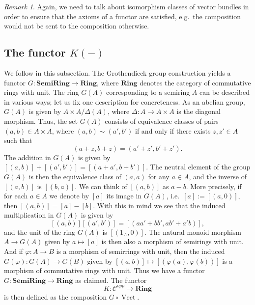 \documentclass[12pt,a4paper]{amsart}
\theoremstyle{plain}
\theoremstyle{definition}
\theoremstyle{remark}
\newtheorem{rem}[thm]{Remark}
\begin{document}
\begin{rem}
  Again, we need to talk about isomorphism classes of vector bundles in order to ensure that the axioms of a functor are satisfied, e.g.~the composition would not be sent to the composition otherwise.
\end{rem} 

\subsection{The functor $K(-)$}
We follow \cite[p.~44]{ati67} in this subsection.
The Grothendieck group construction yields a functor $G \colon \mathbf{SemiRing} \to \mathbf{Ring}$, where $\mathbf{Ring}$ denotes the category of commutative rings with unit.
The ring $G(A)$ corresponding to a semiring $A$ can be described in various ways; let us fix one description for concreteness.
As an abelian group, $G(A)$ is given by $A \times A/\Delta(A)$, where $\Delta \colon A \to A \times A$ is the diagonal morphism.
Thus, the set $G(A)$ consists of equivalence classes of pairs $(a,b) \in A \times A$, where $(a,b) \sim (a',b')$ if and only if there exists $z, z' \in A$ such that
\[ (a + z, b + z) = (a' + z', b' + z'). \]
The addition in $G(A)$ is given by $[(a,b)] + [(a',b')] = [(a + a', b + b')]$.
The neutral element of the group $G(A)$ is then the equivalence class of $(a,a)$ for any $a \in A$, and the inverse of $[(a,b)]$ is $[(b,a)]$.
We can think of $[(a,b)]$ as $a - b$.
More precisely, if for each $a \in A$ we denote by $[a]$ its image in $G(A)$, i.e.~$[a] := [(a,0)]$, then $[(a,b)] = [a] - [b]$.
With this in mind we see that the induced multiplication in $G(A)$ is given by
\[ [(a,b)][(a',b')] = [(aa'+bb', ab' + a'b)], \]
and the unit of the ring $G(A)$ is $[(1_{A},0)]$.
The natural monoid morphism $A \to G(A)$ given by $a \mapsto [a]$ is then also a morphism of semirings with unit.
And if $\varphi \colon A \to B$ is a morphism of semirrings with unit, then the induced $G(\varphi) \colon G(A) \to G(B)$ given by $[(a,b)] \mapsto [(\varphi(a), \varphi(b))]$ is a morphism of commutative rings with unit.
Thus we have a functor $G \colon \mathbf{SemiRing} \to \mathbf{Ring}$ as claimed.
The functor
\[ K \colon \mathcal{C}^{opp} \to \mathbf{Ring} \]
is then defined as the composition $G \circ \operatorname{Vect}$.
\end{document}
